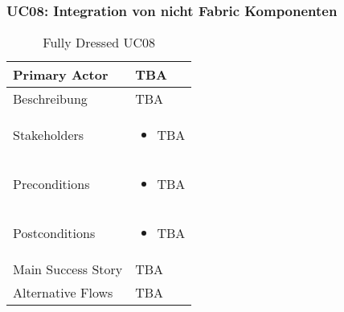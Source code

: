 \subsubsection{UC08: Integration von nicht Fabric Komponenten}
\begin{table}[H]
	\centering
	\begin{tabularx}{\textwidth}{l | X}
		Primary Actor   & TBA        \\
		\hline
		Beschreibung   & TBA  \\ 
		\hline
		Stakeholders       & 
		\begin{itemize}
			\item TBA
		\end{itemize} \\ 
		Preconditions      &
		\begin{itemize}	
			\item TBA
		\end{itemize}  \\
		\hline
		Postconditions     & 
		\begin{itemize}	
			\item TBA
		\end{itemize}  \\
		\hline
		Main Success Story & TBA
		\newline
		\\
		\hline
		Alternative Flows  & 
		TBA \newline
		\newline
	\end{tabularx}
	\caption{Fully Dressed UC08}
	\label{tab:UC08}
\end{table}

